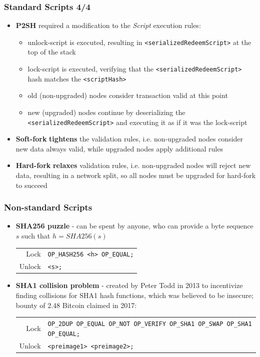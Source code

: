 \documentclass{beamer}
\begin{document}
\begin{frame}[fragile]
  \frametitle{Standard Scripts 4/4}
  \begin{itemize}
  \item \textbf{P2SH} required a modification to the \textit{Script} execution
    rules:
    \begin{itemize}
    \item unlock-script is executed, resulting in
      \texttt{<serializedRedeemScript>} at the top of the stack
    \item lock-script is executed, verifying that the
      \texttt{<serializedRedeemScript>} hash matches the
      \texttt{<scriptHash>}
    \item old (non-upgraded) nodes consider transaction valid at this point
    \item new (upgraded) nodes continue by deserializing the
      \texttt{<serializedRedeemScript>} and executing it as if it
      was the lock-script
    \end{itemize}
  \item \textbf{Soft-fork} \textbf{tightens} the validation rules,
    i.e. non-upgraded nodes consider new data always valid, while upgraded nodes
    apply additional rules
  \item \textbf{Hard-fork} \textbf{relaxes} validation rules, i.e. non-upgraded
    nodes will reject new data, resulting in a network split, so all nodes must
    be upgraded for hard-fork to succeed
  \end{itemize}
\end{frame}

\begin{frame}[fragile]
  \frametitle{Non-standard Scripts}
  \begin{itemize}
  \item \textbf{SHA256 puzzle} - can be spent by anyone, who can provide a byte
    sequence $s$ such that $h = SHA256(s)$
    \break
    \begin{tabular}{rl}
      Lock &\tiny\texttt{OP_HASH256 <h> OP_EQUAL;} \\
      Unlock &\tiny\texttt{<s>;} \\
    \end{tabular}
  \item \textbf{SHA1 collision problem} - created by Peter Todd in 2013 to
    incentivize finding collisions for SHA1 hash functions, which was believed
    to be insecure; bounty of 2.48 Bitcoin claimed in 2017:
    \break
    \begin{tabular}{rl}
      Lock &\tiny\texttt{OP_2DUP OP_EQUAL OP_NOT OP_VERIFY OP_SHA1 OP_SWAP OP_SHA1 OP_EQUAL;} \\
      Unlock &\tiny\texttt{<preimage1> <preimage2>;} \\
    \end{tabular}
  \end{itemize}
\end{frame}
\end{document}
